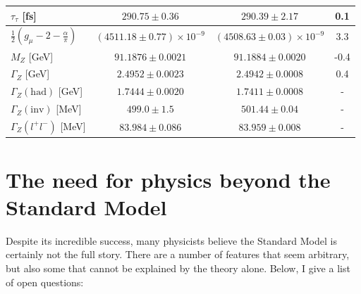 \begin{table}[]
{\begin{tabular}{|l|c|c|c|}
$\tau_\tau$ {[}fs{]}                                      & $290.75 \pm 0.36$                               & $290.39 \pm 2.17$                               & 0.1               \\ \hline
$\frac{1}{2}\left(g_\mu - 2 - \frac{\alpha}{\pi} \right)$ & $\left( 4511.18 \pm 0.77\right) \times 10^{-9}$ & $\left(4508.63 \pm 0.03 \right) \times 10^{-9}$ & 3.3               \\ \hline
$M_Z$ {[}GeV{]}                                           & $91.1876 \pm 0.0021$                            & $91.1884 \pm 0.0020$                            & -0.4              \\ \hline
$\Gamma_Z$ {[}GeV{]}                                      & $2.4952 \pm 0.0023$                             & $2.4942 \pm 0.0008$                             & 0.4               \\ \hline
$\Gamma_Z (\textrm{had})$ {[}GeV{]}                                & $1.7444 \pm 0.0020$                             & $1.7411 \pm 0.0008$                             & -                 \\ \hline
$\Gamma_Z (\textrm{inv})$ {[}MeV{]}                                & $499.0 \pm 1.5$                                 & $501.44 \pm 0.04$                               & -                 \\ \hline
$\Gamma_Z \left(l^+ l^- \right)$ {[}MeV{]}                & $83.984 \pm 0.086$                              & $83.959 \pm 0.008$                              & -                 \\ \hline
\end{tabular}%
}
\end{table}



\section{The need for physics beyond the Standard Model}
\label{needforBSM}
Despite its incredible success, many physicists believe the Standard Model is certainly not the full story. There are a number of features that seem arbitrary, but also some that cannot be explained by the theory alone. Below, I give a list of open questions:

\vspace{2mm}

